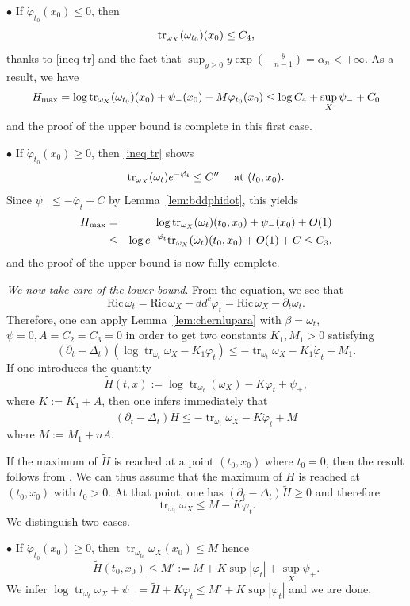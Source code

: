 \documentclass[a4paper,11pt,leqno,english]{smfart}
\theoremstyle{plain}
\theoremstyle{plain}
\numberwithin{equation}{section} %
\numberwithin{figure}{section} %
\theoremstyle{plain}
\theoremstyle{plain}
\theoremstyle{remark}
\theoremstyle{remark}
\theoremstyle{definition}
\theoremstyle{plain}
\theoremstyle{plain}
\theoremstyle{definition}
\newcommand{\wt}{\widetilde}
\newcommand{\om}{\omega}
\newcommand{\f}{\varphi}
\newcommand{\p}{\psi}
\newcommand{\Ric}{\mathrm{Ric} \,}
\renewcommand{\ge}{\geq}
\renewcommand{\le}{\leq}
\newcommand{\tr}{\operatorname{tr}}
\begin{document}
\medskip

$\bullet$ If $\dot\f_{t_0}(x_0)\le 0$, then 
\[{\rm tr}_{\omega_X}(\omega_{t_0}) (x_0) \leq C_4,\]
thanks to \eqref{ineq tr} and the fact that $\sup_{y \geq 0} y \exp(-\frac{y}{n-1}) =\alpha_n <+\infty$. As a result, we have
$$
H_{\rm max}=\log {\rm tr}_{\omega_X}(\omega_{t_0}) (x_0)+\p_-(x_0)-M \f_{t_0}(x_0) \leq\log C_4+\sup_X \p_-+C_0
$$
and the proof of the upper bound is complete in this first case. 

\medskip

$\bullet$ If $\dot\f_{t_0}(x_0)\ge 0$, then \eqref{ineq tr} shows 
\[{\rm tr}_{\omega_X}(\omega_t) e^{-\dot{\f_t}} \leq C''\quad \mbox{ at} \,\, (t_0, x_0).\]
Since $\p_- \leq -\dot{\f_t}+C$ by Lemma~\ref{lem:bddphidot}, this yields
\begin{eqnarray*}
H_{\rm max}&=& \log {\rm tr}_{\omega_X}(\omega_{t})(t_0,x_0)+\psi_{-}(x_0)+O(1) \\
&\leq &  \log e^{-\dot{\f_t}} {\rm tr}_{\omega_X}(\omega_t)(t_0, x_0) +O(1)+C \leq C_3.
\end{eqnarray*}
and the proof of the upper bound is now fully complete.

\bigskip

{\it We now take care of the lower bound}. From the equation, we see that 
$$
\Ric \om_t =\Ric \om_X-dd^c \dot \f_t
= \Ric \om_X - \partial_t \om_t.
$$
Therefore, one can apply Lemma~\ref{lem:chernlupara} with $\beta=\om_t$,  $\psi=0, A=C_2=C_3=0$ in order to get two constants $K_1,M_1>0$ satisfying
\[(\partial_t-\Delta_t)(\log \tr_{\om_t}\om_X-K_1\varphi_t) \le -\tr_{\om_t}\om_X -K_1 \dot \varphi_t+M_1. \]
If one introduces the quantity 
$$
\wt H(t,x):=\log \tr_{\om_t}(\omega_X)-K \f_t+\psi_+,
$$
where $K:=K_1+A$, then one infers immediately that 
\[(\partial_t-\Delta_t) \wt H \le -\tr_{\om_t}\om_X -K \dot \varphi_t+M \]
where $M:=M_1+nA$. 

If the maximum of $\wt H$ is reached at a point $(t_0,x_0)$ where $t_0=0$, then the result follows from \cite[Corollary~2.3]{GSS}. 
We can thus assume that the maximum of $H$ is reached at $(t_0,x_0)$ with $t_0>0$. 
At that point, one has $(\partial_t-\Delta_t) \wt H \ge 0$ and therefore
\[\tr_{\om_t}\om_X \le M-K \dot \varphi_t.\]
We distinguish two cases. 

\smallskip

$\bullet$ If $\dot\f_{t_0}(x_0) \ge 0$, then $\tr_{\om_{t_0}}\om_X(x_0) \le M$ hence
\[
\wt H(t_0, x_0) \le M':=M+K\sup |\f_t| +\sup_X \psi_+.
\]
We infer
$
\log \tr_{\om_t}\om_X+\psi_+ = \wt H+K\f_t 
 \le M'+K\sup |\f_t|
$
and we are done. 
\end{document}
